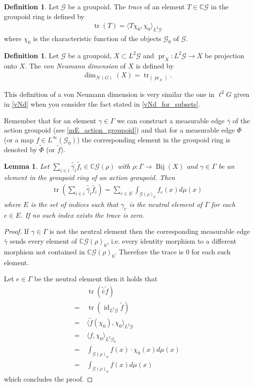 \documentclass[12pt,a4paper]{scrartcl}
\theoremstyle{plain}
\newtheorem{Lemma}[Theorem]{Lemma}
\theoremstyle{definition}
\newtheorem{Definition}[Theorem]{Definition}
\numberwithin{equation}{section}
\newcommand{\C}{\mathbb{C}} %
\newcommand{\2}{\mathbb{Z} / 2 \mathbb{Z}}
\newcommand{\G}{\mathcal{G}}
\newcommand{\1}{\bar{1}}
\newcommand{\0}{\bar{0}}
\newcommand{\Bij}{\operatorname{Bij}}
\newcommand{\tr}{\operatorname{tr}}
\newcommand{\pr}{\operatorname{pr}}
\newcommand{\id}{\operatorname{id}}
\begin{document}
\begin{Definition}
	Let $\G$ be a groupoid. The \emph{trace} of an element $T \in \C \G$ in the groupoid ring is defined by
	\begin{align*}
		\tr(T) = \langle T \chi_0, \chi_0 \rangle_{L^2 \G}
	\end{align*}
	where $\chi_0$ is the characteristic function of the objects $\G_0$ of $\G$.
\end{Definition}
\begin{Definition} \label{vNd_of_groupoids}
	Let $\G$ be a groupoid, $X \subset L^2 \G$ and $\pr_X\colon L^2 \G \to X$ be projection onto $X$. The \emph{von Neumann dimension} of $X$ is defined by
	\begin{align*}
		\dim_{\mathcal{N}(G)}(X) = \tr_(\pr_X).
	\end{align*}
\end{Definition}
This definition of a von Neumann dimension is very similar the one in $\ell^2 G$ given in \ref{vNd} when you consider the fact stated in \ref{vNd_for_subsets}.

Remember that for an element $\gamma \in \Gamma$ we can construct a measurable edge $\bar{\gamma}$ of the action groupoid (see \ref{mE_action_groupoid}) and that for a measurable edge $\Phi$ (or a map $f \in L^\infty (\G_0)$) the corresponding element in the groupoid ring is denoted by $\tilde{\Phi}$ (or $\tilde{f}$).

\begin{Lemma} \label{trgroupoid}
	Let $\sum_{i \in i} \tilde{\bar{\gamma_i}} \tilde{f_i} \in \C\G(\rho)$ with $\rho\colon\Gamma \to \Bij(X)$ and $\gamma \in \Gamma$ be an element in the groupoid ring of an action groupoid. Then
	\begin{align*}
	\tr(\sum_{i \in i} \tilde{\bar{\gamma_i}} \tilde{f_i}) = \sum_{e \in E} \int_{\G(\rho)_0} f_e(x) d\mu(x)
	\end{align*}
	where $E$ is the set of indices such that $\gamma_e$ is the neutral element of $\Gamma$ for each $e \in E$. If no such index exists the trace is zero.
\end{Lemma}
\begin{proof} 
	If $\gamma \in \Gamma$ is not the neutral element then the corresponding measurable edge $\bar{\gamma}$ sends every element of $\C\G(\rho)_0$, i.e. every identity morphism to a different morphism not contained in $\C\G(\rho)_0$. Therefore the trace is $0$ for each such element.
	
	Let $e \in \Gamma$ be the neutral element then it holds that
	\begin{align*}
	&~ \tr(\tilde{\bar{e}} \tilde{f}) \\
	=&~ \tr(\id_{L^2 \G} \tilde{f}) \\
	=&~ \langle \tilde{f} (\chi_0), \chi_0 \rangle_{L^2 \G} \\
	=&~ \langle f, \chi_0 \rangle_{L^2 \G_0} \\
	=&~ \int_{\G(\rho)_0} f(x) \cdot \chi_0(x) d\mu(x) \\
	=&~ \int_{\G(\rho)_0} f(x) d\mu(x)
	\end{align*}
	which concludes the proof.
\end{proof}
\end{document}
